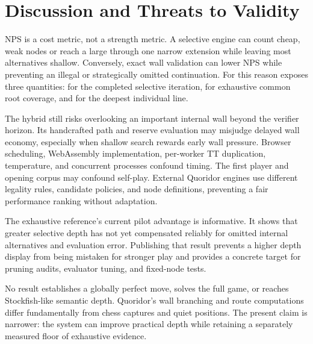 \section{Discussion and Threats to Validity}
NPS is a cost metric, not a strength metric. A selective engine can count cheap, weak nodes or reach a large \selDepth{} through one narrow extension while leaving most alternatives shallow. Conversely, exact wall validation can lower NPS while preventing an illegal or strategically omitted continuation. For this reason \walwuk{} exposes three quantities: \mainDepth{} for the completed selective iteration, \verifiedDepth{} for exhaustive common root coverage, and \selDepth{} for the deepest individual line.

The hybrid still risks overlooking an important internal wall beyond the verifier horizon. Its handcrafted path and reserve evaluation may misjudge delayed wall economy, especially when shallow search rewards early wall pressure. Browser scheduling, WebAssembly implementation, per-worker TT duplication, temperature, and concurrent processes confound timing. The first player and opening corpus may confound self-play. External Quoridor engines use different legality rules, candidate policies, and node definitions, preventing a fair performance ranking without adaptation.

The exhaustive reference's current pilot advantage is informative. It shows that greater selective depth has not yet compensated reliably for omitted internal alternatives and evaluation error. Publishing that result prevents a higher depth display from being mistaken for stronger play and provides a concrete target for pruning audits, evaluator tuning, and fixed-node tests.

No result establishes a globally perfect move, solves the full game, or reaches Stockfish-like semantic depth. Quoridor's wall branching and route computations differ fundamentally from chess captures and quiet positions. The present claim is narrower: the system can improve practical depth while retaining a separately measured floor of exhaustive evidence.
